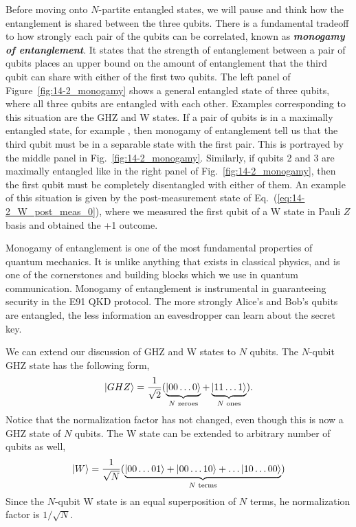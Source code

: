 Before moving onto $N$-partite entangled states, we will pause and think how the entanglement is shared between the three qubits.
There is a fundamental tradeoff to how strongly each pair of the qubits can be correlated, known as \emph{\textbf{monogamy of entanglement}}.
It states that the strength of entanglement between a pair of qubits places an upper bound on the amount of entanglement that the third qubit can share with either of the first two qubits.
The left panel of Figure~\ref{fig:14-2_monogamy} shows a general entangled state of three qubits, where all three qubits are entangled with each other.
Examples corresponding to this situation are the GHZ and W states.
If a pair of qubits is in a maximally entangled state, for example \ket{\Phi+}, then monogamy of entanglement tell us that the third qubit must be in a separable state with the first pair.
This is portrayed by the middle panel in Fig.~\ref{fig:14-2_monogamy}.
Similarly, if qubits 2 and 3 are maximally entangled like in the right panel of Fig.~\ref{fig:14-2_monogamy}, then the first qubit must be completely disentangled with either of them.
An example of this situation is given by the post-measurement state of Eq.~(\ref{eq:14-2_W_post_meas_0}), where we measured the first qubit of a W state in Pauli $Z$ basis and obtained the +1 outcome.

Monogamy of entanglement is one of the most fundamental properties of quantum mechanics.
It is unlike anything that exists in classical physics, and is one of the cornerstones and building blocks which we use in quantum communication.
Monogamy of entanglement is instrumental in guaranteeing security in the E91 QKD protocol.
The more strongly Alice's and Bob's qubits are entangled, the less information an eavesdropper can learn about the secret key.

We can extend our discussion of GHZ and W states to $N$ qubits.
The $N$-qubit GHZ state has the following form,
\begin{equation}
    \left| GHZ \right\rangle = \frac{1}{\sqrt{2}} ( \underbrace{\left| 00\ldots0 \right\rangle}_{N\text{ zeroes}} + \underbrace{\left| 11\ldots1 \right\rangle}_{N \text{ ones}} ).
\end{equation}
Notice that the normalization factor has not changed, even though this is now a GHZ state of $N$ qubits.
The W state can be extended to arbitrary number of qubits as well,
\begin{equation}
    \left| W \right\rangle = \frac{1}{\sqrt{N}} ( \underbrace{\left| 00\ldots01 \right\rangle + \left| 00\ldots10 \right\rangle + \ldots \left| 10\ldots00 \right\rangle}_{N \text{ terms}} )
\end{equation}
Since the $N$-qubit W state is an equal superposition of $N$ terms, he normalization factor is $1 / \sqrt{N}$.

